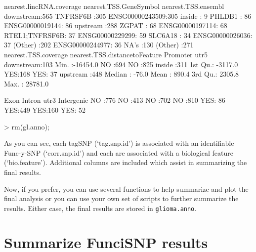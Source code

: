 \documentclass[12pt,fullpage]{article}
\newcommand{\Robject}[1]{{\texttt{#1}}}
\begin{document}
\begin{Schunk}
\begin{Soutput}
 nearest.lincRNA.coverage    nearest.TSS.GeneSymbol      nearest.TSS.ensembl
 downstream:565           TNFRSF6B      :305        ENSG00000243509:305     
 inside    :  9           PHLDB1        : 86        ENSG00000019144: 86     
 upstream  :288           ZGPAT         : 68        ENSG00000197114: 68     
                          RTEL1;TNFRSF6B: 37        ENSG00000229299: 59     
                          SLC6A18       : 34        ENSG00000026036: 37     
                          (Other)       :202        ENSG00000244977: 36     
                          NA's          :130        (Other)        :271     
 nearest.TSS.coverage nearest.TSS.distancetoFeature Promoter   utr5    
 downstream:103       Min.   :-16454.0              NO :694   NO :825  
 inside    :311       1st Qu.: -3117.0              YES:168   YES: 37  
 upstream  :448       Median :   -76.0                                 
                      Mean   :   890.4                                 
                      3rd Qu.:  2305.8                                 
                      Max.   : 28781.0                                 
                                                                       
  Exon     Intron     utr3     Intergenic
 NO :776   NO :413   NO :702   NO :810   
 YES: 86   YES:449   YES:160   YES: 52   
\end{Soutput}
\begin{Sinput}
> rm(gl.anno);
\end{Sinput}
\end{Schunk}

As you can see, each tagSNP (`tag.snp.id') is associated with an identifiable
Func-y-SNP (`corr.snp.id') and each are associated with a biological feature
(`bio.feature'). Additional columns are included which assist in summarizing the
final results.

Now, if you prefer, you can use several functions to help summarize and plot
the final analysis or you can use your own set of scripts to further summarize
the results.  Either case, the final results are stored in
\Robject{glioma.anno}.

\section{Summarize FunciSNP results}
\end{document}
